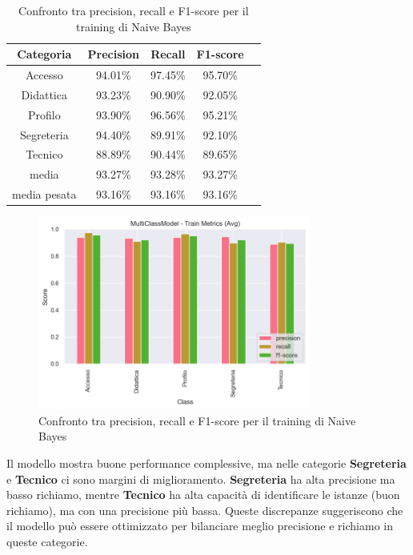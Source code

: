 \begin{table}[H]
    \centering
    \begin{tabular}{|c|c|c|c|c|}
        \hline
        \textbf{Categoria} & \textbf{Precision} & \textbf{Recall} & \textbf{F1-score} \\
        \hline
        Accesso & 94.01\% & 97.45\% & 95.70\% \\
        \hline
        Didattica & 93.23\% & 90.90\% & 92.05\% \\
        \hline
        Profilo & 93.90\% & 96.56\% & 95.21\% \\
        \hline
        Segreteria & 94.40\% & 89.91\% & 92.10\% \\
        \hline
        Tecnico & 88.89\% & 90.44\% & 89.65\% \\
        \hline
        media & 93.27\% & 93.28\% & 93.27\% \\
        \hline
        media pesata & 93.16\% & 93.16\% & 93.16\% \\
        \hline
    \end{tabular}
    \caption{Confronto tra precision, recall e F1-score per il training di Naive Bayes}
    \label{tab:metriche_naive_bayes_train}
\end{table}

\begin{figure}[H]
    \centering
    \includegraphics[width=0.8\textwidth]{images/metrics_train_naive_bayes.png}
    \caption{Confronto tra precision, recall e F1-score per il training di Naive Bayes}
    \label{fig:metrics_train_naive_bayes}
\end{figure}

Il modello mostra buone performance complessive, ma nelle categorie \textbf{Segreteria} e \textbf{Tecnico} ci sono margini di miglioramento. \textbf{Segreteria} ha alta precisione ma basso richiamo, mentre \textbf{Tecnico} ha alta capacità di identificare le istanze (buon richiamo), ma con una precisione più bassa. Queste discrepanze suggeriscono che il modello può essere ottimizzato per bilanciare meglio precisione e richiamo in queste categorie.

